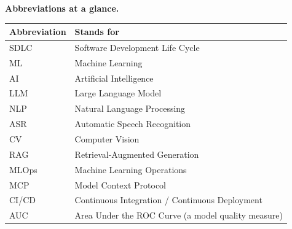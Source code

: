 \documentclass[a4paper,11pt]{article}
\begin{document}
\medskip
\noindent\textbf{Abbreviations at a glance.}
\begin{center}\small
\begin{tabular}{@{}ll@{}}
\toprule
\textbf{Abbreviation} & \textbf{Stands for} \\
\midrule
SDLC & Software Development Life Cycle \\
ML & Machine Learning \\
AI & Artificial Intelligence \\
LLM & Large Language Model \\
NLP & Natural Language Processing \\
ASR & Automatic Speech Recognition \\
CV & Computer Vision \\
RAG & Retrieval-Augmented Generation \\
MLOps & Machine Learning Operations \\
MCP & Model Context Protocol \\
CI/CD & Continuous Integration / Continuous Deployment \\
AUC & Area Under the ROC Curve (a model quality measure) \\
\bottomrule
\end{tabular}
\end{center}
\end{document}
